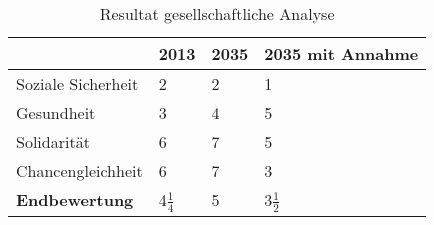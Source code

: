 \begin{table}[h]
    \centering
    \begin{tabular}{l|lll} & \textbf{2013} & \textbf{2035} &  \textbf{2035 mit Annahme} 
        \\ \hline Soziale Sicherheit    & 2  & 2  & 1
        \\ Gesundheit                   & 3  & 4  & 5
        \\ Solidarität                  & 6  & 7  & 5
        \\ Chancengleichheit            & 6  & 7  & 3
        \\ \hline \textbf{Endbewertung} & 4\(\frac{1}{4}\)  & 5  & 3\(\frac{1}{2}\)
    \end{tabular}
    \caption{Resultat gesellschaftliche Analyse}
\end{table}
